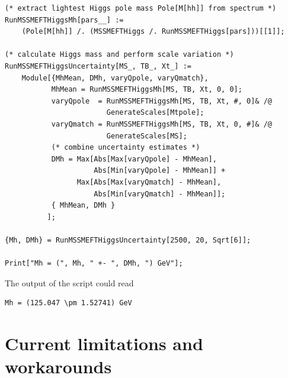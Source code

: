 \documentclass[final,3p,11pt,pdflatex]{elsarticle}
\begin{document}
\begin{example}[label=ex:MSSMEFTHiggs_uncertainty_estimate]
\begin{lstlisting}
(* extract lightest Higgs pole mass Pole[M[hh]] from spectrum *)
RunMSSMEFTHiggsMh[pars__] :=
    (Pole[M[hh]] /. (MSSMEFTHiggs /. RunMSSMEFTHiggs[pars]))[[1]];

(* calculate Higgs mass and perform scale variation *)
RunMSSMEFTHiggsUncertainty[MS_, TB_, Xt_] :=
    Module[{MhMean, DMh, varyQpole, varyQmatch},
           MhMean = RunMSSMEFTHiggsMh[MS, TB, Xt, 0, 0];
           varyQpole  = RunMSSMEFTHiggsMh[MS, TB, Xt, #, 0]& /@
                        GenerateScales[Mtpole];
           varyQmatch = RunMSSMEFTHiggsMh[MS, TB, Xt, 0, #]& /@
                        GenerateScales[MS];
           (* combine uncertainty estimates *)
           DMh = Max[Abs[Max[varyQpole] - MhMean],
                     Abs[Min[varyQpole] - MhMean]] +
                 Max[Abs[Max[varyQmatch] - MhMean],
                     Abs[Min[varyQmatch] - MhMean]];
           { MhMean, DMh }
          ];

{Mh, DMh} = RunMSSMEFTHiggsUncertainty[2500, 20, Sqrt[6]];

Print["Mh = (", Mh, " +- ", DMh, ") GeV"];
  \end{lstlisting}
  The output of the script could read
  \begin{lstlisting}
Mh = (125.047 \pm 1.52741) GeV
  \end{lstlisting}
\end{example}

\section{Current limitations and workarounds}
\label{sec:limitations}
\end{document}
